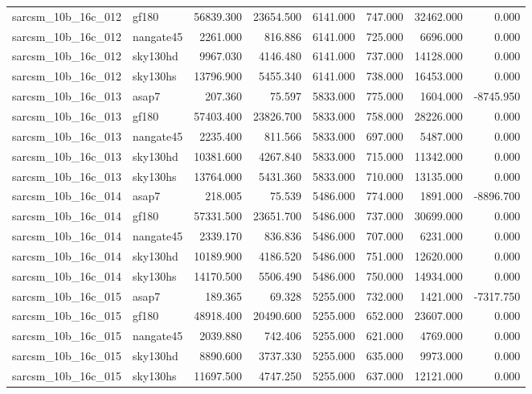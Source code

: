 \begin{tabular}{llrrrrrr}
sarcsm\_10b\_16c\_012 & gf180 & 56839.300 & 23654.500 & 6141.000 & 747.000 & 32462.000 & 0.000 \\
sarcsm\_10b\_16c\_012 & nangate45 & 2261.000 & 816.886 & 6141.000 & 725.000 & 6696.000 & 0.000 \\
sarcsm\_10b\_16c\_012 & sky130hd & 9967.030 & 4146.480 & 6141.000 & 737.000 & 14128.000 & 0.000 \\
sarcsm\_10b\_16c\_012 & sky130hs & 13796.900 & 5455.340 & 6141.000 & 738.000 & 16453.000 & 0.000 \\
sarcsm\_10b\_16c\_013 & asap7 & 207.360 & 75.597 & 5833.000 & 775.000 & 1604.000 & -8745.950 \\
sarcsm\_10b\_16c\_013 & gf180 & 57403.400 & 23826.700 & 5833.000 & 758.000 & 28226.000 & 0.000 \\
sarcsm\_10b\_16c\_013 & nangate45 & 2235.400 & 811.566 & 5833.000 & 697.000 & 5487.000 & 0.000 \\
sarcsm\_10b\_16c\_013 & sky130hd & 10381.600 & 4267.840 & 5833.000 & 715.000 & 11342.000 & 0.000 \\
sarcsm\_10b\_16c\_013 & sky130hs & 13764.000 & 5431.360 & 5833.000 & 710.000 & 13135.000 & 0.000 \\
sarcsm\_10b\_16c\_014 & asap7 & 218.005 & 75.539 & 5486.000 & 774.000 & 1891.000 & -8896.700 \\
sarcsm\_10b\_16c\_014 & gf180 & 57331.500 & 23651.700 & 5486.000 & 737.000 & 30699.000 & 0.000 \\
sarcsm\_10b\_16c\_014 & nangate45 & 2339.170 & 836.836 & 5486.000 & 707.000 & 6231.000 & 0.000 \\
sarcsm\_10b\_16c\_014 & sky130hd & 10189.900 & 4186.520 & 5486.000 & 751.000 & 12620.000 & 0.000 \\
sarcsm\_10b\_16c\_014 & sky130hs & 14170.500 & 5506.490 & 5486.000 & 750.000 & 14934.000 & 0.000 \\
sarcsm\_10b\_16c\_015 & asap7 & 189.365 & 69.328 & 5255.000 & 732.000 & 1421.000 & -7317.750 \\
sarcsm\_10b\_16c\_015 & gf180 & 48918.400 & 20490.600 & 5255.000 & 652.000 & 23607.000 & 0.000 \\
sarcsm\_10b\_16c\_015 & nangate45 & 2039.880 & 742.406 & 5255.000 & 621.000 & 4769.000 & 0.000 \\
sarcsm\_10b\_16c\_015 & sky130hd & 8890.600 & 3737.330 & 5255.000 & 635.000 & 9973.000 & 0.000 \\
sarcsm\_10b\_16c\_015 & sky130hs & 11697.500 & 4747.250 & 5255.000 & 637.000 & 12121.000 & 0.000 \\

\end{tabular}
